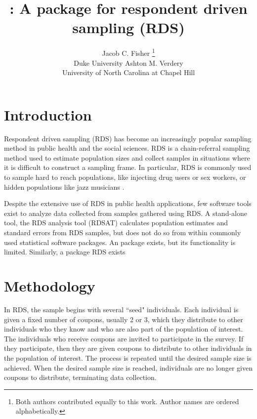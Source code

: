 \documentclass[article, shortnames]{jss}
\author{Jacob C. Fisher
        \thanks{Both authors contributed equally to this work.  Author names are ordered alphabetically.}
	       \\Duke University \And 
        Ashton M. Verdery\\University of North Carolina at Chapel Hill
								}
\title{\pkg{RDS2}: A \proglang{Stata} package for respondent driven sampling (RDS)}
\begin{document}

\section[Introduction]{Introduction}
Respondent driven sampling (RDS) has become an increasingly popular sampling method in public health and the social sciences. RDS is a chain-referral sampling method used to estimate population sizes and collect samples in situations where it is difficult to construct a sampling frame.  In particular, RDS is commonly used to sample hard to reach populations, like injecting drug users or sex workers, or hidden populations like jazz musicians \citep{heckathorn97}.

Despite the extensive use of RDS in public health applications, few software tools exist to analyze data collected from samples gathered using RDS.  A stand-alone tool, the RDS analysis tool (RDSAT) \citep{rdsat} calculates population estimates and standard errors from RDS samples, but does not do so from within commonly used statistical software packages.  An  package  \citep{r-rds} exists, but its functionality is limited.  Similarly, a  package RDS \citep{stata-rds} exists 

\section[Methodology]{Methodology}
In RDS, the sample begins with several ``seed" individuals.  Each individual is given a fixed number of coupons, usually 2 or 3, which they distribute to other individuals who they know and who are also part of the population of interest.  The individuals who receive coupons are invited to participate in the survey.  If they participate, then they are given coupons to distribute to other individuals in the population of interest.  The process is repeated until the desired sample size is achieved.  When the desired sample size is reached, individuals are no longer given coupons to distribute, terminating data collection.   




\end{document}
